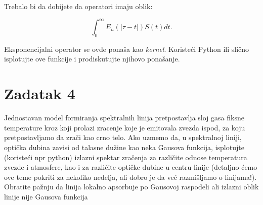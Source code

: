 \documentclass[12pt]{article}
\begin{document}
Trebalo bi da dobijete da operatori imaju oblik: 

\begin{equation}
\int_0^{\infty} E_n(|\tau-t|) S(t) dt.
\end{equation}

Eksponencijalni operator se ovde pona\v{s}a kao \emph{kernel}. Koriste\'{c}i Python ili sli\v{c}no isplotujte ove funkcije i prodiskutujte njihovo pona\v{s}anje. 

\section{Zadatak 4}

Jednostavan model formiranja spektralnih linija pretpostavlja sloj gasa fiksne temperature kroz koji prolazi zracenje koje je emitovala zvezda ispod, za koju pretpostavljamo da zra\v{c}i kao crno telo. Ako uzmemo da, u spektralnoj liniji, opti\v{c}ka dubina zavisi od talasne du\v{z}ine kao neka Gausova funkcija, isplotujte (koristeći npr python) izlazni spektar zračenja za različite odnose temperatura zvezde i atmosfere, kao i za različite optičke dubine u centru linije (detaljno ćemo ove teme pokriti za nekoliko nedelja, ali dobro je da već razmišljamo o linijama!). Obratite pa\v{z}nju da linija lokalno apsorbuje po Gausovoj raspodeli ali izlazni oblik linije nije Gausova funkcija
\end{document}

